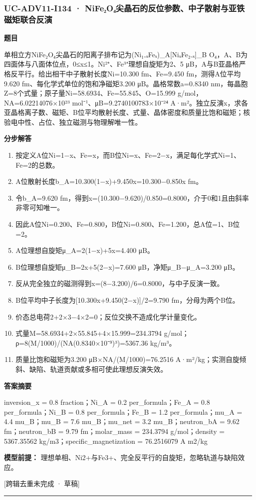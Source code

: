 \documentclass[UTF8,11pt,a4paper]{ctexart}
\begin{document}
\subsubsection*{UC-ADV11-I134 · NiFe₂O₄尖晶石的反位参数、中子散射与亚铁磁矩联合反演}
\noindent\textbf{题目}\par
单相立方NiFe₂O₄尖晶石的阳离子排布记为(Ni₁₋ₓFeₓ)\_A[NiₓFe₂₋ₓ]\_B O₄，A、B为四面体与八面体位点，0≤x≤1。Ni²⁺、Fe³⁺理想自旋矩为2、5 μB，A与B亚晶格严格反平行。给出相干中子散射长度Ni=10.300 fm、Fe=9.450 fm，测得A位平均9.620 fm、每化学式单位的饱和净磁矩3.200 μB。晶格常数a=0.8340 nm，每晶胞Z=8个式量；原子量Ni=58.6934、Fe=55.845、O=15.999 g/mol，NA=6.02214076×10²³ mol⁻¹、μB=9.2740100783×10⁻²⁴ A·m²。独立反演x，求各亚晶格离子数、磁矩、B位平均散射长度、式量、晶体密度和质量比饱和磁矩；核验电中性、占位、独立磁测与物理解唯一性。\par
\medskip\noindent\textbf{分步解答}
\begin{enumerate}
\item 按定义A位Ni=1−x、Fe=x，而B位Ni=x、Fe=2−x，满足每化学式Ni=1、Fe=2的总数。
\item A位散射长度b\_A=10.300(1−x)+9.450x=10.300−0.850x fm。
\item 令b\_A=9.620 fm，得到x=(10.300−9.620)/0.850=0.8000，介于0和1且由斜率非零可知唯一。
\item 因此A位Ni=0.200、Fe=0.800，B位Ni=0.800、Fe=1.200，总A位=1、B位=2。
\item A位理想自旋矩μ\_A=2(1−x)+5x=4.400 μB。
\item B位理想自旋矩μ\_B=2x+5(2−x)=7.600 μB，净矩μ\_B−μ\_A=3.200 μB。
\item 反从完全独立的磁测得到x=(8−3.200)/6=0.8000，与中子反演一致。
\item B位平均中子长度为[10.300x+9.450(2−x)]/2=9.790 fm，分母为两个B位。
\item 价态总电荷2+2×3−4×2=0；反位交换不造成化学计量变化。
\item 式量M=58.6934+2×55.845+4×15.999=234.3794 g/mol；ρ=8(M/1000)/(NA(0.8340×10⁻⁹)³)=5367.36 kg/m³。
\item 质量比饱和磁矩为3.200 μB×NA/(M/1000)=76.2516 A·m²/kg；实测自旋倾斜、缺陷、轨道贡献或多相可使此理想反演失效。
\end{enumerate}
\noindent\textbf{答案摘要}\par
inversion\_x = 0.8 fraction；Ni\_A = 0.2 per\_formula；Fe\_A = 0.8 per\_formula；Ni\_B = 0.8 per\_formula；Fe\_B = 1.2 per\_formula；mu\_A = 4.4 mu\_B；mu\_B = 7.6 mu\_B；mu\_net = 3.2 mu\_B；neutron\_bA = 9.62 fm；neutron\_bB = 9.79 fm；molar\_mass = 234.3794 g/mol；density = 5367.35562 kg/m3；specific\_magnetization = 76.2516079 A m2/kg\par
\noindent\textbf{模型前提：}
理想单相、Ni2+与Fe3+、完全反平行的自旋矩，忽略轨道与缺陷效应。\par
\noindent\textcolor{red!65!black}{[跨辑去重未完成 · 草稿]} \par
\medskip\hrule\medskip
{}
\end{document}
